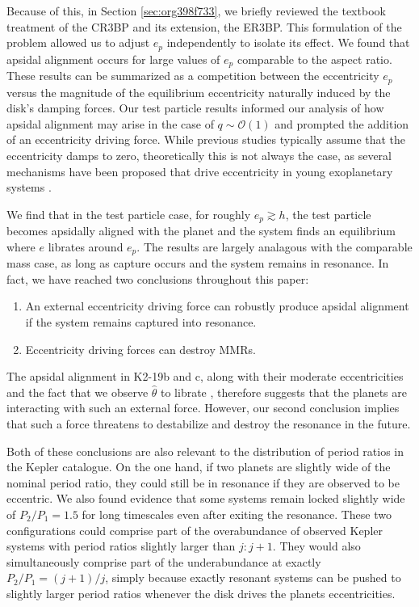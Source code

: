 \documentclass[usenatbib,onecolumn]{mnras}
\begin{document}
Because of this, in Section \ref{sec:org398f733}, we briefly reviewed
the textbook treatment of the CR3BP and its extension, the ER3BP.
This formulation of the problem allowed us to adjust \(e_p\)
independently to isolate its effect.  We found that apsidal alignment
occurs for large values of \(e_p\) comparable to the aspect ratio. These
results can be summarized as a competition between the eccentricity
\(e_p\) versus the magnitude of the equilibrium eccentricity naturally
induced by the disk's damping forces.  Our test particle results
informed our analysis of how apsidal alignment may arise in the case
of \(q\sim\mathcal{O}(1)\) and prompted the addition of an eccentricity
driving force.  While previous studies typically assume that the
eccentricity damps to zero, theoretically this is not always the case,
as several mechanisms have been proposed that drive eccentricity in
young exoplanetary systems
\citep{ragusa17_eccen_evolut_durin_planet_disc_inter,goldreich03_eccen_evolut_planet_gaseous_disks,teyssandier17_secul_evolut_eccen_protop_discs}.

We find that in the test particle case, for roughly \(e_p \gtrsim h\),
the test particle becomes apsidally aligned with the planet and the
system finds an equilibrium where \(e\) librates around \(e_p\).  The
results are largely analagous with the comparable mass case, as long
as capture occurs and the system remains in resonance.  In fact, we
have reached two conclusions throughout this paper:
\begin{enumerate}[label=\arabic*.]
  \item An external eccentricity driving force can robustly produce
apsidal alignment if the system remains captured into resonance.
  \item Eccentricity driving forces can destroy MMRs.
\end{enumerate}

\noindent The apsidal alignment in K2-19b and c, along with
their moderate eccentricities and the fact that we observe
\(\hat\theta\) to librate \citep{petit_resonance_2020}, therefore
suggests that the planets are interacting with such an external force.
However, our second conclusion implies that such a force threatens to
destabilize and destroy the resonance in the future.

Both of these conclusions are also relevant to the distribution of
period ratios in the Kepler catalogue.  On the one hand, if two
planets are slightly wide of the nominal period ratio, they could
still be in resonance if they are observed to be eccentric.  We also
found evidence that some systems remain locked slightly wide of
\(P_2/P_1=1.5\) for long timescales even after exiting the resonance.
These two configurations could comprise part of the overabundance of
observed Kepler systems with period ratios slightly larger than
\(j:j+1\). They would also simultaneously comprise part of the
underabundance at exactly \(P_2/P_1 = (j+1)/j\), simply because exactly
resonant systems can be pushed to slightly larger period ratios
whenever the disk drives the planets eccentricities.
\end{document}
